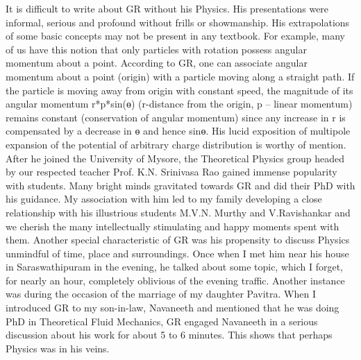 It is difficult to write about GR without his Physics. His presentations were informal, serious and profound without frills or showmanship. His extrapolations of some basic concepts may not be present in any textbook. For example, many of us have this notion that only particles with rotation possess angular momentum about a point. According to GR, one can associate angular momentum about a point (origin) with a particle moving along a straight path.  If the particle is moving away from origin with constant speed, the magnitude of its angular momentum r*p*sin(ɵ) (r-distance from the origin, p – linear momentum) remains constant (conservation of angular momentum) since any increase in r is compensated by a decrease in ɵ and hence sinɵ. His lucid exposition of multipole expansion of the potential of arbitrary charge distribution is worthy of mention. After he joined the University of Mysore, the Theoretical Physics group headed by our respected teacher Prof. K.N. Srinivasa Rao gained immense popularity with students. Many bright minds gravitated towards GR and did their PhD with his guidance. My association with him led to my family developing a close relationship with his illustrious students M.V.N. Murthy and V.Ravishankar and we cherish the many intellectually stimulating and happy moments spent with them. Another special characteristic of GR was his propensity to discuss Physics unmindful of time, place and surroundings. Once when I met him near his house in Saraswathipuram in the evening, he talked about some topic, which I forget, for nearly an hour, completely oblivious of the evening traffic. Another instance was during the occasion of the marriage of my daughter Pavitra. When I introduced GR to my son-in-law, Navaneeth and mentioned that he was doing PhD in Theoretical Fluid Mechanics, GR engaged Navaneeth in a serious discussion about his work for about 5 to 6 minutes. This shows that perhaps Physics was in his veins.

